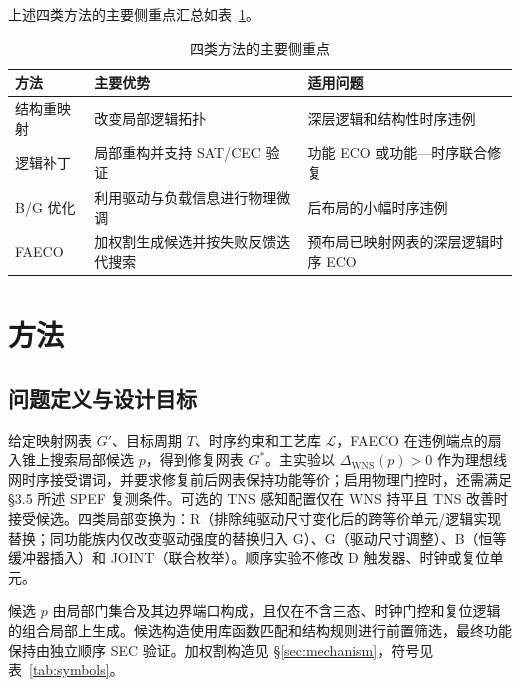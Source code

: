 \documentclass[twocolumn,10pt,fontset=windows]{ctexart}
\begin{document}
上述四类方法的主要侧重点汇总如表~\ref{tab:related_diff}。

\begin{table}[H]
\centering
\caption{四类方法的主要侧重点}
\label{tab:related_diff}
\footnotesize
\setlength{\tabcolsep}{2pt}
\begin{tabular}{>{\raggedright\arraybackslash}p{1.55cm}>{\raggedright\arraybackslash}p{2.55cm}>{\raggedright\arraybackslash}p{3.2cm}}
\toprule
\textbf{方法} & \textbf{主要优势} & \textbf{适用问题} \\
\midrule
结构重映射 & 改变局部逻辑拓扑 & 深层逻辑和结构性时序违例 \\
逻辑补丁 & 局部重构并支持 SAT/CEC 验证 & 功能 ECO 或功能—时序联合修复 \\
B/G 优化 & 利用驱动与负载信息进行物理微调 & 后布局的小幅时序违例 \\
FAECO & 加权割生成候选并按失败反馈迭代搜索 & 预布局已映射网表的深层逻辑时序 ECO \\
\bottomrule
\end{tabular}
\end{table}

\FloatBarrier
\section{方法}

\subsection{问题定义与设计目标}
给定映射网表 $G'$、目标周期 $T$、时序约束和工艺库 $\mathcal{L}$，FAECO 在违例端点的扇入锥上搜索局部候选 $p$，得到修复网表 $G^*$。主实验以 $\Delta_{\mathrm{WNS}}(p)>0$ 作为理想线网时序接受谓词，并要求修复前后网表保持功能等价；启用物理门控时，还需满足 §3.5 所述 SPEF 复测条件。可选的 TNS 感知配置仅在 WNS 持平且 TNS 改善时接受候选。四类局部变换为：R（排除纯驱动尺寸变化后的跨等价单元/逻辑实现替换；同功能族内仅改变驱动强度的替换归入 G）、G（驱动尺寸调整）、B（恒等缓冲器插入）和 JOINT（联合枚举）。顺序实验不修改 D 触发器、时钟或复位单元。

候选 $p$ 由局部门集合及其边界端口构成，且仅在不含三态、时钟门控和复位逻辑的组合局部上生成。候选构造使用库函数匹配和结构规则进行前置筛选，最终功能保持由独立顺序 SEC 验证。加权割构造见 \S\ref{sec:mechanism}，符号见表~\ref{tab:symbols}。
\end{document}
